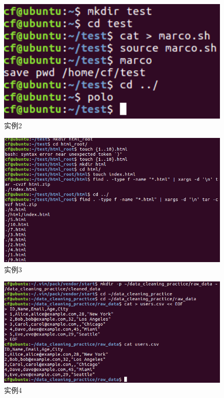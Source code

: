 \documentclass[cn,12pt]{report}
\begin{document}
  \begin{figure}[htbp]
    \centering
    \includegraphics[width=1\textwidth]{image/2.png}
    \caption{实例2}
  \end{figure}

    \begin{figure}[htbp]
    \centering
    \includegraphics[width=1\textwidth]{image/3.png}
    \caption{实例3}
  \end{figure}

    \begin{figure}[htbp]
    \centering
    \includegraphics[width=1\textwidth]{image/4.png}
    \caption{实例4}
  \end{figure}
\end{document}
